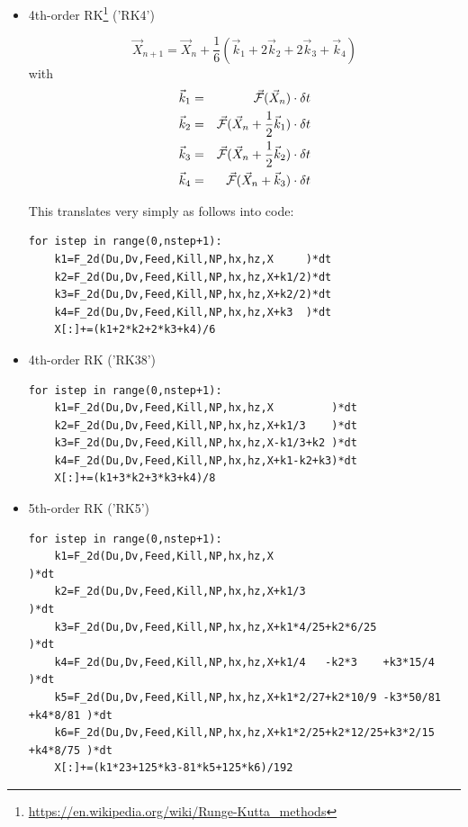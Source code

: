 \begin{itemize}
\item 4th-order RK\footnote{\url{https://en.wikipedia.org/wiki/Runge-Kutta_methods}} ('RK4')

\[
\vec{X}_{n+1} = \vec{X}_n + 
\frac{1}{6}\left(\vec{k}_1 + 2\vec{k}_2 + 2\vec{k}_3 + \vec{k}_4\right)
\]
with
\begin{eqnarray}
\vec{k}_1 &=& \vec{\cal F}(\vec{X}_n) \cdot \delta t\nonumber\\
\vec{k}_2 &=& \vec{\cal F}(\vec{X}_n+ \frac12\vec{k}_1) \cdot \delta t \nonumber\\
\vec{k}_3 &=& \vec{\cal F}(\vec{X}_n+ \frac12\vec{k}_2) \cdot \delta t \nonumber\\
\vec{k}_4 &=& \vec{\cal F}(\vec{X}_n+ \vec{k}_3)    \cdot \delta t \nonumber
\end{eqnarray}

This translates very simply as follows into code:
\begin{lstlisting}
for istep in range(0,nstep+1):
    k1=F_2d(Du,Dv,Feed,Kill,NP,hx,hz,X     )*dt
    k2=F_2d(Du,Dv,Feed,Kill,NP,hx,hz,X+k1/2)*dt
    k3=F_2d(Du,Dv,Feed,Kill,NP,hx,hz,X+k2/2)*dt
    k4=F_2d(Du,Dv,Feed,Kill,NP,hx,hz,X+k3  )*dt
    X[:]+=(k1+2*k2+2*k3+k4)/6
\end{lstlisting}


\item 4th-order RK ('RK38')

\begin{lstlisting}
for istep in range(0,nstep+1):
    k1=F_2d(Du,Dv,Feed,Kill,NP,hx,hz,X         )*dt
    k2=F_2d(Du,Dv,Feed,Kill,NP,hx,hz,X+k1/3    )*dt
    k3=F_2d(Du,Dv,Feed,Kill,NP,hx,hz,X-k1/3+k2 )*dt
    k4=F_2d(Du,Dv,Feed,Kill,NP,hx,hz,X+k1-k2+k3)*dt
    X[:]+=(k1+3*k2+3*k3+k4)/8
\end{lstlisting}

\item 5th-order RK ('RK5')

\begin{lstlisting}
for istep in range(0,nstep+1):
    k1=F_2d(Du,Dv,Feed,Kill,NP,hx,hz,X                                    )*dt
    k2=F_2d(Du,Dv,Feed,Kill,NP,hx,hz,X+k1/3                               )*dt
    k3=F_2d(Du,Dv,Feed,Kill,NP,hx,hz,X+k1*4/25+k2*6/25                    )*dt
    k4=F_2d(Du,Dv,Feed,Kill,NP,hx,hz,X+k1/4   -k2*3    +k3*15/4           )*dt
    k5=F_2d(Du,Dv,Feed,Kill,NP,hx,hz,X+k1*2/27+k2*10/9 -k3*50/81 +k4*8/81 )*dt
    k6=F_2d(Du,Dv,Feed,Kill,NP,hx,hz,X+k1*2/25+k2*12/25+k3*2/15  +k4*8/75 )*dt
    X[:]+=(k1*23+125*k3-81*k5+125*k6)/192
\end{lstlisting}


\end{itemize}
